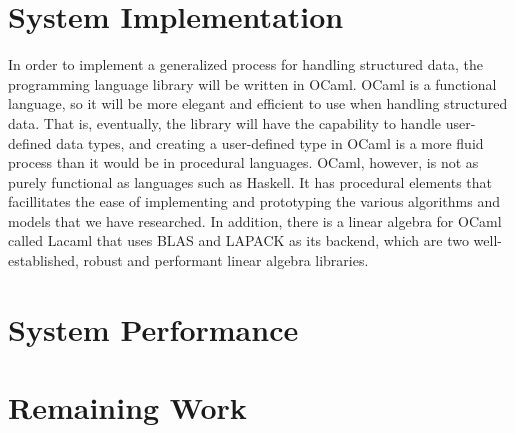\documentclass{sig-alternate}
\begin{document}
\section{System Implementation}
\label{sec:sysimp}

In order to implement a generalized process for handling structured data, the programming language 
library will be written in OCaml. OCaml is a functional language, so it will be more elegant and 
efficient to use when handling structured data. That is, eventually, the library will have the 
capability to handle user-defined data types, and creating a user-defined type in OCaml is a more
fluid process than it would be in procedural languages. OCaml, however, is not as purely functional 
as languages such as Haskell. It has procedural elements that facillitates the ease of implementing and prototyping the various algorithms and models that we have researched. In addition, there is a 
linear algebra for OCaml called Lacaml that uses BLAS and LAPACK as its backend, which are two
well-established, robust and performant linear algebra libraries.


\section{System Performance}
\label{sec:sysperformance}


\section{Remaining Work}
\label{sec:project_proposal}
\end{document}
